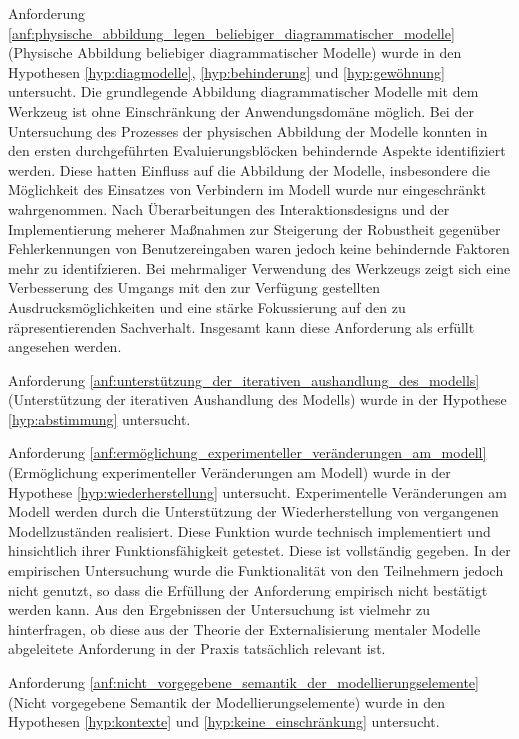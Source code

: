 Anforderung \ref{anf:physische_abbildung_legen_beliebiger_diagrammatischer_modelle} (Physische Abbildung beliebiger diagrammatischer Modelle) wurde in den Hypothesen \ref{hyp:diagmodelle}, \ref{hyp:behinderung} und \ref{hyp:gewöhnung} untersucht. Die grundlegende Abbildung diagrammatischer Modelle mit dem Werkzeug ist ohne Einschränkung der Anwendungsdomäne möglich. Bei der Untersuchung des Prozesses der physischen Abbildung der Modelle konnten in den ersten durchgeführten Evaluierungsblöcken behindernde Aspekte identifiziert werden. Diese hatten Einfluss auf die Abbildung der Modelle, insbesondere die Möglichkeit des Einsatzes von Verbindern im Modell wurde nur eingeschränkt wahrgenommen. Nach Überarbeitungen des Interaktionsdesigns und der Implementierung meherer Maßnahmen zur Steigerung der Robustheit gegenüber Fehlerkennungen von Benutzereingaben waren jedoch keine behindernde Faktoren mehr zu identifzieren. Bei mehrmaliger Verwendung des Werkzeugs zeigt sich eine Verbesserung des Umgangs mit den zur Verfügung gestellten Ausdrucksmöglichkeiten und eine stärke Fokussierung auf den zu räpresentierenden Sachverhalt. Insgesamt kann diese Anforderung als erfüllt angesehen werden.

\todo Anforderung \ref{anf:unterstützung_der_iterativen_aushandlung_des_modells} (Unterstützung der iterativen Aushandlung des Modells) wurde in der Hypothese \ref{hyp:abstimmung} untersucht.

Anforderung \ref{anf:ermöglichung_experimenteller_veränderungen_am_modell} (Ermöglichung experimenteller Veränderungen am Modell) wurde in der Hypothese \ref{hyp:wiederherstellung} untersucht. Experimentelle Veränderungen am Modell werden durch die Unterstützung der Wiederherstellung von vergangenen Modellzuständen realisiert. Diese Funktion wurde technisch implementiert und hinsichtlich ihrer Funktionsfähigkeit getestet. Diese ist vollständig gegeben. In der empirischen Untersuchung wurde die Funktionalität von den Teilnehmern jedoch nicht genutzt, so dass die Erfüllung der Anforderung empirisch nicht bestätigt werden kann. Aus den Ergebnissen der Untersuchung ist vielmehr zu hinterfragen, ob diese aus der Theorie der Externalisierung mentaler Modelle abgeleitete Anforderung in der Praxis tatsächlich relevant ist.

\todo Anforderung \ref{anf:nicht_vorgegebene_semantik_der_modellierungselemente} (Nicht vorgegebene Semantik der Modellierungselemente) wurde in den Hypothesen \ref{hyp:kontexte} und \ref{hyp:keine_einschränkung} untersucht. 

